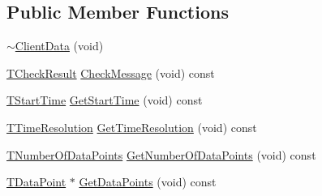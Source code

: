 \subsection*{Public Member Functions}
\begin{DoxyCompactItemize}
\item 
\hyperlink{class_terra_swarm_1_1_asynchronous_1_1_client_data_a7ef007db6436f43f2fa6b503e3ad690e}{$\sim$\-Client\-Data} (void)
\item 
\hyperlink{class_terra_swarm_1_1_asynchronous_1_1_client_data_a91575e9105c574792d5216d40f1c89de}{T\-Check\-Result} \hyperlink{class_terra_swarm_1_1_asynchronous_1_1_client_data_a6d290292eacc3416e00da93b3f79d8c3}{Check\-Message} (void) const 
\item 
\hyperlink{class_terra_swarm_1_1_asynchronous_1_1_client_data_a70b07646d3a13d9c2cb16ade44a49966}{T\-Start\-Time} \hyperlink{class_terra_swarm_1_1_asynchronous_1_1_client_data_af78cac737c5197ad17205bab73421b60}{Get\-Start\-Time} (void) const 
\item 
\hyperlink{class_terra_swarm_1_1_asynchronous_1_1_client_data_a626a7d114c405bceb24262253fe36c71}{T\-Time\-Resolution} \hyperlink{class_terra_swarm_1_1_asynchronous_1_1_client_data_a6e3ca8aab58e0b40867eee3e3ec281e6}{Get\-Time\-Resolution} (void) const 
\item 
\hyperlink{class_terra_swarm_1_1_asynchronous_1_1_client_data_a690994afd0ba9b8eeb56ae679a5c64e8}{T\-Number\-Of\-Data\-Points} \hyperlink{class_terra_swarm_1_1_asynchronous_1_1_client_data_aba73075c35dd912dad8f99dd026b0785}{Get\-Number\-Of\-Data\-Points} (void) const 
\item 
\hyperlink{class_terra_swarm_1_1_asynchronous_1_1_client_data_ac733720fed15e940f991de44f1bb514e}{T\-Data\-Point} $\ast$ \hyperlink{class_terra_swarm_1_1_asynchronous_1_1_client_data_a72ed5a08a0bbe088b3b6f4d79cdbab2d}{Get\-Data\-Points} (void) const 
\end{DoxyCompactItemize}

